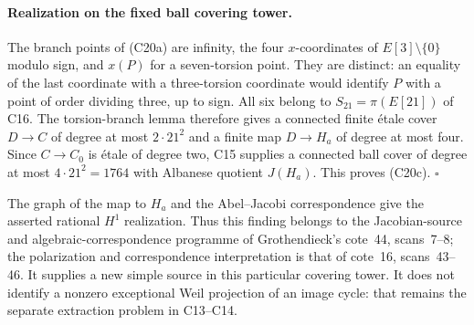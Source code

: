 \paragraph{Realization on the fixed ball covering tower.}
The branch points of (C20a) are infinity, the four
$x$-coordinates of $E[3]\setminus\{0\}$ modulo sign,
and $x(P)$ for a seven-torsion point. They are distinct:
an equality of the last coordinate with a three-torsion
coordinate would identify $P$ with a point of order
dividing three, up to sign. All six belong to
$S_{21}=\pi(E[21])$ of C16. The torsion-branch lemma
therefore gives a connected finite \'etale cover
$D\to C$ of degree at most $2\cdot21^2$ and a finite
map $D\to H_a$ of degree at most four. Since
$C\to C_0$ is \'etale of degree two, C15 supplies
a connected ball cover of degree at most
$4\cdot21^2=1764$ with Albanese quotient $J(H_a)$.
This proves (C20c). \hfill$\square$

The graph of the map to $H_a$ and the Abel--Jacobi
correspondence give the asserted rational $H^1$
realization. Thus this finding belongs to the
Jacobian-source and algebraic-correspondence programme
of Grothendieck's cote~44, scans~7--8; the
polarization and correspondence interpretation is
that of cote~16, scans~43--46. It supplies a new
simple source in this particular covering tower.
It does not identify a nonzero exceptional Weil
projection of an image cycle: that remains the
separate extraction problem in C13--C14.
